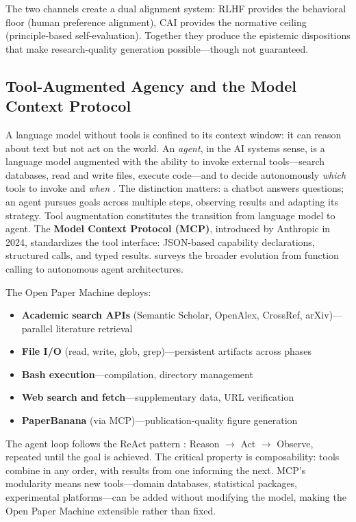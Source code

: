 \documentclass{article}
\begin{document}
The two channels create a dual alignment system: RLHF provides the behavioral floor (human preference alignment), CAI provides the normative ceiling (principle-based self-evaluation). Together they produce the epistemic dispositions that make research-quality generation possible---though not guaranteed.

\subsection{Tool-Augmented Agency and the Model Context Protocol}

A language model without tools is confined to its context window: it can reason about text but not act on the world. An \textit{agent}, in the AI systems sense, is a language model augmented with the ability to invoke external tools---search databases, read and write files, execute code---and to decide autonomously \textit{which} tools to invoke and \textit{when} \citep{wang2024survey,handler2023taxonomy}. The distinction matters: a chatbot answers questions; an agent pursues goals across multiple steps, observing results and adapting its strategy. Tool augmentation constitutes the transition from language model to agent. The \textbf{Model Context Protocol (MCP)}, introduced by Anthropic in 2024, standardizes the tool interface: JSON-based capability declarations, structured calls, and typed results. \citet{viswanathan2026tooluse} surveys the broader evolution from function calling to autonomous agent architectures.

The Open Paper Machine deploys:

\begin{itemize}
  \item \textbf{Academic search APIs} (Semantic Scholar, OpenAlex, CrossRef, arXiv)---parallel literature retrieval
  \item \textbf{File I/O} (read, write, glob, grep)---persistent artifacts across phases
  \item \textbf{Bash execution}---compilation, directory management
  \item \textbf{Web search and fetch}---supplementary data, URL verification
  \item \textbf{PaperBanana} (via MCP)---publication-quality figure generation
\end{itemize}

The agent loop follows the ReAct pattern \citep{yao2022react}: Reason $\rightarrow$ Act $\rightarrow$ Observe, repeated until the goal is achieved. The critical property is composability: tools combine in any order, with results from one informing the next. MCP's modularity means new tools---domain databases, statistical packages, experimental platforms---can be added without modifying the model, making the Open Paper Machine extensible rather than fixed.
\end{document}
